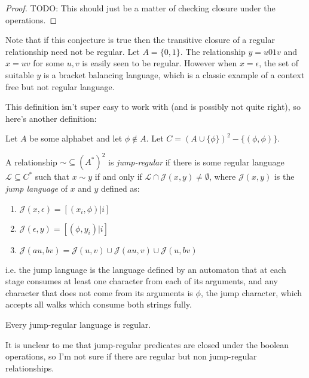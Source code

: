 \begin{proof}
TODO: This should just be a matter of checking closure under the operations.
\end{proof}

Note that if this conjecture is true then the transitive closure of a regular relationship need not be regular.
Let \(A = \{0, 1\}\).
The relationship \(y = u01v\) and \(x = uv\) for some \(u, v\) is easily seen to be regular.
However when \(x = \epsilon\),
the set of suitable \(y\) is a bracket balancing language,
which is a classic example of a context free but not regular language.

This definition isn't super easy to work with (and is possibly not quite right),
so here's another definition:

\begin{definition}
Let \(A\) be some alphabet and let \(\phi \not\in A\).
Let \(C = (A \cup \{\phi\})^2 - \{(\phi, \phi)\}\).

A relationship \(\sim \subseteq (A^*)^2\) is \emph{jump-regular} if there is some regular language \(\mathcal{L} \subseteq C^*\) such that \(x \sim y\) if and only if \(\mathcal{L} \cap \mathcal{J}(x, y) \neq \emptyset\),
where \(\mathcal{J}(x, y)\) is the \emph{jump language} of \(x\) and \(y\) defined as:

\begin{enumerate}
\item \(\mathcal{J}(x, \epsilon) = [(x_i, \phi) | i]\)
\item \(\mathcal{J}(\epsilon, y) = [(\phi, y_i) | i]\)
\item \(\mathcal{J}(au, bv) = \mathcal{J}(u, v) \cup \mathcal{J}(au, v) \cup \mathcal{J}(u, bv)\)
\end{enumerate}

i.e. the jump language is the language defined by an automaton that at each stage consumes at least one character from each of its arguments,
and any character that does not come from its arguments is \(\phi\), the jump character,
which accepts all walks which consume both strings fully.

\end{definition}


\begin{conjecture}
Every jump-regular language is regular.
\end{conjecture}

It is unclear to me that jump-regular predicates are closed under the boolean operations,
so I'm not sure if there are regular but non jump-regular relationships.

